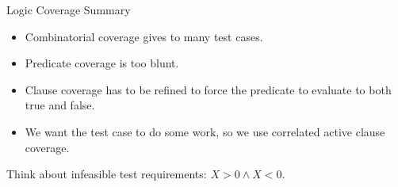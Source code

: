 \documentclass{beamer}
\begin{document}
\begin{frame}{Logic Coverage Summary}
  \begin{itemize}
  \item Combinatorial coverage gives to many test cases.
  \item Predicate coverage is too blunt.
  \item Clause coverage has to be refined to force the predicate to
    evaluate to both true and false.
  \item We want the test case to do some work, so we use correlated
    active clause coverage.
  \end{itemize}
  Think about infeasible   test requirements: $X>0 \land X<0$.
\end{frame}
\end{document}

